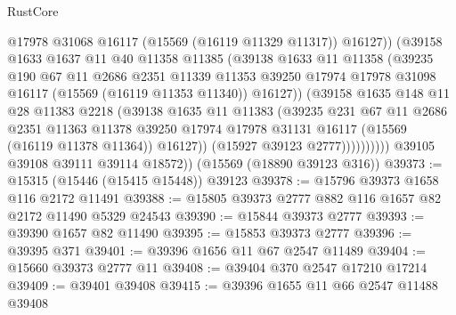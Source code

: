 \begin{lexlean}{RustCore}
\begin{coremodule}
                          @17978
                          @31068
                          @16117
                          (@15569 (@16119 @11329 @11317))
                          @16127))
                      (@39158
                        @1633
                        @1637
                        @11
                        @40
                        @11358
                        @11385
                        (@39138
                          @1633
                          @11
                          @11358
                          (@39235
                            @190
                            @67
                            @11
                            @2686
                            @2351
                            @11339
                            @11353
                            @39250
                            @17974
                            @17978
                            @31098
                            @16117
                            (@15569 (@16119 @11353 @11340))
                            @16127))
                        (@39158
                          @1635
                          @148
                          @11
                          @28
                          @11383
                          @2218
                          (@39138
                            @1635
                            @11
                            @11383
                            (@39235
                              @231
                              @67
                              @11
                              @2686
                              @2351
                              @11363
                              @11378
                              @39250
                              @17974
                              @17978
                              @31131
                              @16117
                              (@15569 (@16119 @11378 @11364))
                              @16127))
                          (@15927 @39123 @2777))))))))))
        @39105
        @39108
        @39111
        @39114
        @18572))
    (@15569 (@18890 @39123 @316))
@39373 := @15315 (@15446 (@15415 @15448)) @39123
@39378 := @15796 @39373 @1658 @116 @2172 @11491
@39388 := @15805 @39373 @2777 @882 @116 @1657 @82 @2172 @11490 @5329 @24543
@39390 := @15844 @39373 @2777
@39393 := @39390 @1657 @82 @11490
@39395 := @15853 @39373 @2777
@39396 := @39395 @371
@39401 := @39396 @1656 @11 @67 @2547 @11489
@39404 := @15660 @39373 @2777 @11
@39408 := @39404 @370 @2547 @17210 @17214
@39409 := @39401 @39408
@39415 := @39396 @1655 @11 @66 @2547 @11488 @39408

\end{coremodule}
\end{lexlean}
